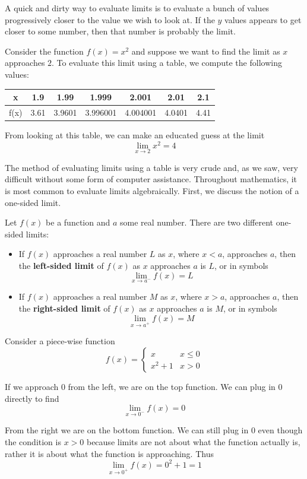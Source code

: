 A quick and dirty way to evaluate limits is to evaluate a bunch of values progressively closer to the value we wish to look at. If the $y$ values appears to get closer to some number, then that number is probably the limit.

\begin{example}

Consider the function $f(x) = x^2$ and suppose we want to find the limit as $x$ approaches $2$. To evaluate this limit using a table, we compute the following values:

\begin{center}
\begin{tabular}{|c|c|c|c|c|c|c|}
\hline 
x & 1.9 & 1.99 & 1.999 & 2.001 & 2.01 & 2.1 \\ 
\hline 
f(x) & 3.61 & 3.9601 & 3.996001 & 4.004001 & 4.0401 & 4.41 \\ 
\hline 
\end{tabular} 
\end{center}

From looking at this table, we can make an educated guess at the limit
\[ \lim_{x \to 2} x^2 = 4 \]

\end{example}

The method of evaluating limits using a table is very crude and, as we saw, very difficult without some form of computer assistance. Throughout mathematics, it is most common to evaluate limits algebraically. First, we discuss the notion of a one-sided limit.

\newpage 
\begin{definition}
Let $f(x)$ be a function and $a$ some real number. There are two different one-sided limits:
\begin{itemize}
	\item If $f(x)$ approaches a real number $L$ as $x$, where $x < a$, approaches $a$, then the \textbf{left-sided limit} of $f(x)$ as $x$ approaches $a$ is $L$, or in symbols
	\[ \lim_{x \to a^-} f(x) = L \]
	\item If $f(x)$ approaches a real number $M$ as $x$, where $x > a$, approaches $a$, then the \textbf{right-sided limit} of $f(x)$ as $x$ approaches $a$ is $M$, or in symbols
	\[ \lim_{x \to a^+} f(x) = M \]
\end{itemize}
\end{definition}

\begin{example}
Consider a piece-wise function
\[ f(x) = \begin{cases} 
x & x \leq 0 \\
x^2 + 1 & x > 0
\end{cases} \]

If we approach 0 from the left, we are on the top function. We can plug in 0 directly to find
\[ \lim_{x \to 0^-} f(x) = 0 \]

From the right we are on the bottom function. We can still plug in 0 even though the condition is $x > 0$ because limits are not about what the function actually is, rather it is about what the function is approaching. Thus
\[ \lim_{x \to 0^+} f(x) = 0^2 + 1 = 1 \]

\end{example}


